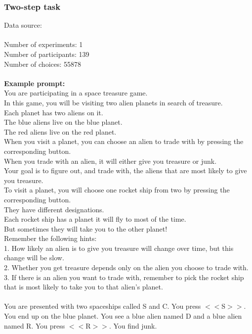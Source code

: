 \documentclass[pdflatex,sn-nature]{sn-jnl}%
\theoremstyle{thmstyleone}%
\theoremstyle{thmstyletwo}%
\theoremstyle{thmstylethree}%
\begin{document}
\subsubsection*{Two-step task}
Data source: \cite{Zorowitz_Niv_2023} \\ $~$ \\
Number of experiments: 1 $~$\\ 
Number of participants: 139 $~$\\ 
Number of choices: 55878 $~$\\ 
 $~$\\ 
\textbf{Example prompt:}
 $~$\\ 
You are participating in a space treasure game. $~$\\ 
In this game, you will be visiting two alien planets in search of treasure. $~$\\ 
Each planet has two aliens on it. $~$\\ 
The blue aliens live on the blue planet. $~$\\ 
The red aliens live on the red planet. $~$\\ 
When you visit a planet, you can choose an alien to trade with by pressing the corresponding button. $~$\\ 
When you trade with an alien, it will either give you treasure or junk. $~$\\ 
Your goal is to figure out, and trade with, the aliens that are most likely to give you treasure. $~$\\ 
To visit a planet, you will choose one rocket ship from two by pressing the corresponding button. $~$\\ 
They have different designations. $~$\\ 
Each rocket ship has a planet it will fly to most of the time. $~$\\ 
But sometimes they will take you to the other planet! $~$\\ 
Remember the following hints: $~$\\ 
1. How likely an alien is to give you treasure will change over time, but this change will be slow. $~$\\ 
2. Whether you get treasure depends only on the alien you choose to trade with. $~$\\ 
3. If there is an alien you want to trade with, remember to pick the rocket ship that is most likely to take you to that alien’s planet. $~$\\ 
 $~$\\ 
You are presented with two spaceships called S and C. You press $<<$S$>>$. You end up on the blue planet. You see a blue alien named D and a blue alien named R. You press $<<$R$>>$. You find junk. $~$\\ 
\end{document}

